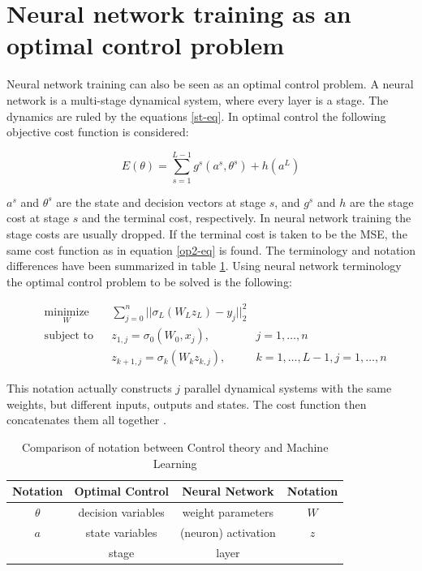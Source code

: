 \section{Neural network training as an optimal control problem}
Neural network training can also be seen as an optimal control problem. A neural network is a multi-stage dynamical system, where every layer is a stage. The dynamics are ruled by the equations \ref{st-eq}. In optimal control the following objective cost function is considered:

\begin{equation}
E(\theta) = \sum\limits_{s=1}^{L-1}g^s(a^s,\theta^s) + h(a^L)
\end{equation}


$a^s$ and $\theta^s$ are the state and decision vectors at stage $s$, and $g^s$ and $h$ are the stage cost at stage $s$ and the terminal cost, respectively. In neural network training the stage costs are usually dropped. If the terminal cost is taken to be the MSE, the same cost function as in equation \ref{op2-eq} is found. The terminology and notation differences have been summarized in table \ref{trans-tbl}. Using neural network terminology the optimal control problem to be solved is the following:

\begin{equation}
	\begin{aligned}
	& \underset{W}{\text{minimize}}
	& & \sum\limits_{j=0}^{n}||\sigma_L(W_Lz_L) - y_j||^2_2 \\
	& \text{subject to}
	& & z_{1,j} = \sigma_0(W_0,x_j), &j = 1,\ldots,n \\
	& & & z_{k+1,j} = \sigma_k(W_kz_{k,j}), &k = 1,\ldots,L-1,j = 1,\ldots,n
	\end{aligned}
	\label{ocp-eq}
\end{equation}

This notation actually constructs $j$ parallel dynamical systems with the same weights, but different inputs, outputs and states. The cost function then concatenates them all together \cite{dreyfus1990}.

\begin{table}
\centering
\begin{tabular}{c | c | c | c}
Notation & Optimal Control & Neural Network & Notation\\ \hline
$\theta$ & decision variables & weight parameters & $W$\\
$a$ & state variables & (neuron) activation & $z$\\
& stage & layer \\
\end{tabular}
\caption{Comparison of notation between Control theory and Machine Learning}
\label{trans-tbl}
\end{table}


